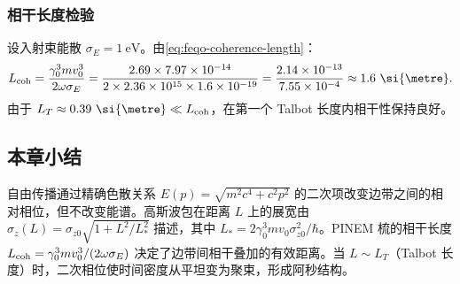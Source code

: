 \subsubsection{相干长度检验}

设入射束能散 $\sigma_E=1\ \si{\electronvolt}$。由\cref{eq:feqo-coherence-length}：
\begin{equation}
L_{\rm coh}=\frac{\gamma_0^3mv_0^3}{2\omega\sigma_E}
=\frac{2.69\times7.97\times10^{-14}}{2\times2.36\times10^{15}\times1.6\times10^{-19}}
=\frac{2.14\times10^{-13}}{7.55\times10^{-4}}
\approx 1.6\ \si{\metre}.
\label{eq:feqo-lcoh-numerical}
\end{equation}
由于 $L_T\approx 0.39\ \si{\metre}\ll L_{\rm coh}$，在第一个 Talbot 长度内相干性保持良好。

\subsection{本章小结}

自由传播通过精确色散关系 $E(p)=\sqrt{m^2c^4+c^2p^2}$ 的二次项改变边带之间的相对相位，但不改变能谱。高斯波包在距离 $L$ 上的展宽由 $\sigma_z(L)=\sigma_{z0}\sqrt{1+L^2/L_*^2}$ 描述，其中 $L_*=2\gamma_0^3mv_0\sigma_{z0}^2/\hbar$。PINEM 梳的相干长度 $L_{\rm coh}=\gamma_0^3mv_0^3/(2\omega\sigma_E)$ 决定了边带间相干叠加的有效距离。当 $L\sim L_T$（Talbot 长度）时，二次相位使时间密度从平坦变为聚束，形成阿秒结构。





